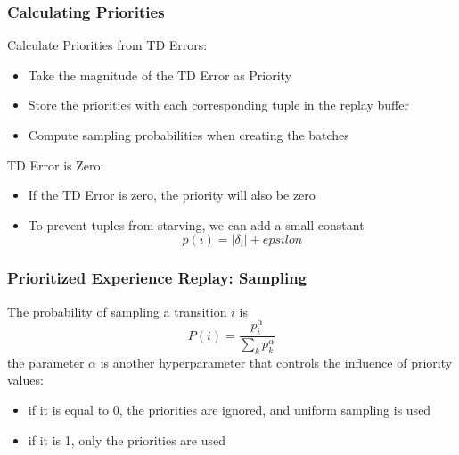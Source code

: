 \subsubsection*{Calculating Priorities}
Calculate Priorities from TD Errors:
\begin{itemize}
    \item Take the magnitude of the TD Error as Priority
    \item Store the priorities with each corresponding tuple in the replay buffer
    \item Compute sampling probabilities when creating the batches
\end{itemize}
TD Error is Zero:
\begin{itemize}
    \item If the TD Error is zero, the priority will also be zero
    \item To prevent tuples from starving, we can add a small constant
    \[
    p(i) = |\delta_i| + epsilon
    \]
\end{itemize}
\subsubsection*{Prioritized Experience Replay: Sampling}
The probability of sampling a transition \(i\) is
\[
P(i) = \frac{p_i^\alpha}{\sum_{k}^{}p_k^\alpha}
\]
the parameter \(\alpha\) is another hyperparameter that controls the influence of priority values:
\begin{itemize}
    \item if it is equal to 0, the priorities are ignored, and uniform sampling is used
    \item if it is 1, only the priorities are used
\end{itemize}

